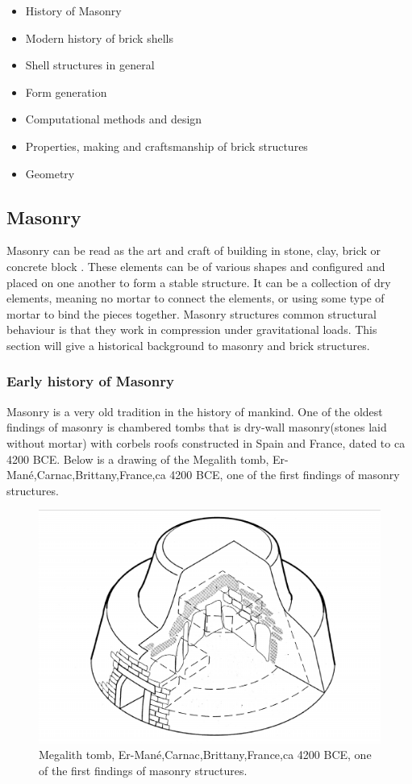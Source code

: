 \vspace{5mm}
\begin{itemize}
\item History of Masonry
\item Modern history of brick shells
\item Shell structures in general
\item Form generation
\item Computational methods and design
\item Properties, making and craftsmanship of brick structures
\item Geometry
\end{itemize}

\subsection{Masonry}

Masonry can be read as the art and craft of building in stone, clay, brick or concrete block \cite{ref:brickBrit}. These elements can be of various shapes and configured and placed on one another to form a stable structure. It can be a collection of dry elements, meaning no mortar to connect the elements, or using some type of mortar to bind the pieces together. Masonry structures common structural behaviour is that they work in compression under gravitational loads. This section will give a historical background to masonry and brick structures.


\subsubsection{Early history of Masonry}
Masonry is a very old tradition in the history of mankind. One of the oldest findings of masonry is  chambered tombs that is  dry-wall masonry(stones laid without mortar) with corbels roofs constructed in Spain and France, dated to ca 4200 BCE\cite{ref:buildConstrBrit}. Below is a drawing of the Megalith tomb, Er-Mané,Carnac,Brittany,France,ca 4200 BCE, one of the first findings of masonry structures.  

\begin{figure}[H]
\centering
\includegraphics[height=0.4\linewidth ]{figure/Introduction/oldMasonry2.pdf}
\caption{ Megalith tomb, Er-Mané,Carnac,Brittany,France,ca 4200 BCE, one of the first findings of masonry structures.\cite{ref:WorldHistory}}
\end{figure}

